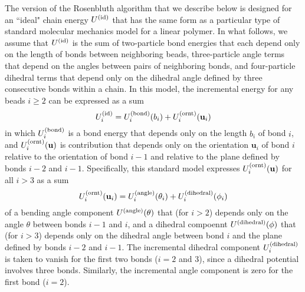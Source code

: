\documentclass[12pt]{article}
\newcommand{\vv}[1]{\mathbf{#1}}
\newcommand\Uid{U^{({\rm id})}}
\newcommand\ubond{\vv{u}}
\newcommand\rbond{b}
\newcommand\Ubond{U^{({\rm bond})}}
\newcommand\Uornt{U^{({\rm ornt})}}
\newcommand\Uangle{U^{({\rm angle})}}
\newcommand\Udihedral{U^{({\rm dihedral})}}
\begin{document}
The version of the Rosenbluth algorithm that we describe below is designed for an ``ideal" chain energy $\Uid$ that has the same form as a particular type of standard molecular mechanics model for a linear polymer. In what follows, we assume that $\Uid$ is the sum of two-particle bond energies that each depend only on the length of bonds between neighboring beads, three-particle angle terms that depend on the angles between pairs of neighboring bonds, and four-particle dihedral terms that depend only on the dihedral angle defined by three consecutive bonds within a chain. In this model, the incremental energy for any beads $i \geq 2$ can be expressed as a sum
\begin{equation}
   \Uid_{i} = \Ubond_{i}(\rbond_{i}) + \Uornt_{i}(\ubond_{i})
\end{equation}
in which $\Ubond_{i}$ is a bond energy that depends only on the length $\rbond_{i}$ of bond $i$, and $\Uornt_{i}(\ubond)$ is contribution that depends only on the orientation $\ubond_{i}$ of bond $i$ relative to the orientation of bond $i-1$ and relative to the plane defined by bonds $i-2$ and $i-1$. Specifically, this standard model expresses $\Uornt_{i}(\ubond)$ for all $i > 3$ as a sum
\begin{equation}
   \Uornt_{i}(\ubond_{i}) = \Uangle_{i}(\theta_{i}) 
                          + \Udihedral_{i}(\phi_{i}) 
\end{equation}
of a bending angle component $\Uangle(\theta)$ that (for $i>2$) depends only on the angle $\theta$ between bonds $i-1$ and $i$, and a dihedral compoennt $\Udihedral(\phi)$ that (for $i > 3$) depends only on the dihedral angle between bond $i$ and the plane defined by bonds $i-2$ and $i-1$. The incremental dihedral component $\Udihedral_{i}$ is taken to vanish for the first two bonds ($i=2$ and $3$), since a dihedral potential involves three bonds. Similarly, the incremental angle component is zero for the first bond ($i=2$). 
\end{document}
